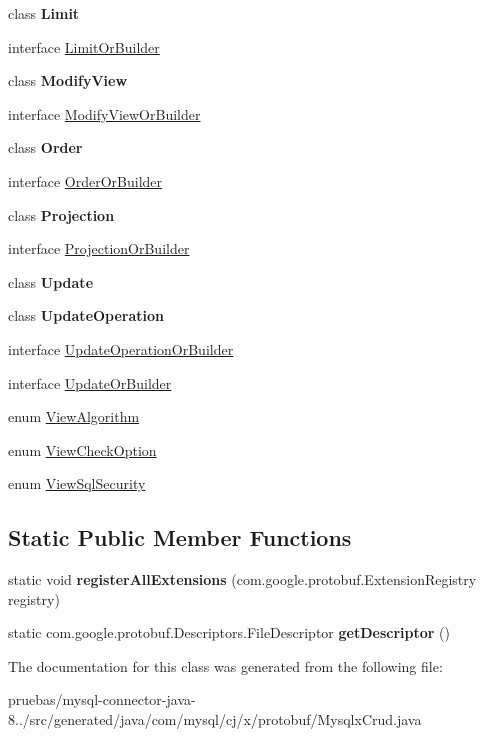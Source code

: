 \begin{DoxyCompactItemize}
\item 
class {\bfseries Limit}
\item 
interface \mbox{\hyperlink{interfacecom_1_1mysql_1_1cj_1_1x_1_1protobuf_1_1_mysqlx_crud_1_1_limit_or_builder}{Limit\+Or\+Builder}}
\item 
class {\bfseries Modify\+View}
\item 
interface \mbox{\hyperlink{interfacecom_1_1mysql_1_1cj_1_1x_1_1protobuf_1_1_mysqlx_crud_1_1_modify_view_or_builder}{Modify\+View\+Or\+Builder}}
\item 
class {\bfseries Order}
\item 
interface \mbox{\hyperlink{interfacecom_1_1mysql_1_1cj_1_1x_1_1protobuf_1_1_mysqlx_crud_1_1_order_or_builder}{Order\+Or\+Builder}}
\item 
class {\bfseries Projection}
\item 
interface \mbox{\hyperlink{interfacecom_1_1mysql_1_1cj_1_1x_1_1protobuf_1_1_mysqlx_crud_1_1_projection_or_builder}{Projection\+Or\+Builder}}
\item 
class {\bfseries Update}
\item 
class {\bfseries Update\+Operation}
\item 
interface \mbox{\hyperlink{interfacecom_1_1mysql_1_1cj_1_1x_1_1protobuf_1_1_mysqlx_crud_1_1_update_operation_or_builder}{Update\+Operation\+Or\+Builder}}
\item 
interface \mbox{\hyperlink{interfacecom_1_1mysql_1_1cj_1_1x_1_1protobuf_1_1_mysqlx_crud_1_1_update_or_builder}{Update\+Or\+Builder}}
\item 
enum \mbox{\hyperlink{enumcom_1_1mysql_1_1cj_1_1x_1_1protobuf_1_1_mysqlx_crud_1_1_view_algorithm}{View\+Algorithm}}
\item 
enum \mbox{\hyperlink{enumcom_1_1mysql_1_1cj_1_1x_1_1protobuf_1_1_mysqlx_crud_1_1_view_check_option}{View\+Check\+Option}}
\item 
enum \mbox{\hyperlink{enumcom_1_1mysql_1_1cj_1_1x_1_1protobuf_1_1_mysqlx_crud_1_1_view_sql_security}{View\+Sql\+Security}}
\end{DoxyCompactItemize}
\subsection*{Static Public Member Functions}
\begin{DoxyCompactItemize}
\item 
\mbox{\label{classcom_1_1mysql_1_1cj_1_1x_1_1protobuf_1_1_mysqlx_crud_a2927ce119a78def2e1356307be256996}} 
static void {\bfseries register\+All\+Extensions} (com.\+google.\+protobuf.\+Extension\+Registry registry)
\item 
\mbox{\label{classcom_1_1mysql_1_1cj_1_1x_1_1protobuf_1_1_mysqlx_crud_a3ae25aea11ecd8e5cf721fd281021f10}} 
static com.\+google.\+protobuf.\+Descriptors.\+File\+Descriptor {\bfseries get\+Descriptor} ()
\end{DoxyCompactItemize}


The documentation for this class was generated from the following file\+:\begin{DoxyCompactItemize}
\item 
pruebas/mysql-\/connector-\/java-\/8../src/generated/java/com/mysql/cj/x/protobuf/Mysqlx\+Crud.\+java\end{DoxyCompactItemize}
